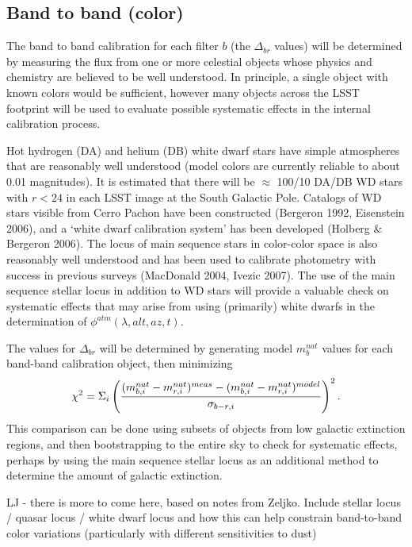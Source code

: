 \documentclass[12pt,preprint]{aastex}
\begin{document}
\subsection{Band to band (color)}

The band to band calibration for each filter $b$ (the $\Delta_{br}$
values) will be determined by measuring the flux from one or more
celestial objects whose physics and chemistry are believed to be well
understood. In principle, a single object with known colors would be
sufficient, however many objects across the LSST footprint
will be used to evaluate possible systematic effects in the internal
calibration process. 

Hot hydrogen (DA) and helium (DB) white dwarf stars have simple
atmospheres that are reasonably well understood (model colors are
currently reliable to about 0.01 magnitudes). It is estimated that
there will be $\approx$ 100/10 DA/DB WD stars with $r<24$ in each LSST
image at the South Galactic Pole. Catalogs of WD stars visible from
Cerro Pachon have been constructed (Bergeron 1992, Eisenstein
2006), and a `white dwarf calibration system' has been developed
(Holberg \& Bergeron 2006). The locus of main sequence stars in
color-color space is also reasonably well understood and has been used
to calibrate photometry with success in previous surveys (MacDonald
2004, Ivezic 2007). The use of the main sequence stellar locus in addition to
WD stars will provide a valuable check on systematic effects that may
arise from using (primarily) white dwarfs in the determination of
$\phi^{atm}(\lambda,alt,az,t)$. 

The values for $\Delta_{br}$ will be determined by generating model
$m_b^{nat}$ values for each band-band calibration object, then
minimizing 
\begin{equation}
\chi^2 = \Sigma_{i} \left( { (m_{b,i}^{nat} - m_{r,i}^{nat})^{meas} - (m_{b,i}^{nat}
    - m_{r,i}^{nat})^{model} \over  \sigma_{b-r,i}}\right) ^2. 
\end{equation}
This comparison can
be done using subsets of objects from low galactic extinction regions,
and then bootstrapping to the entire sky to check for systematic
effects, perhaps by using the main sequence stellar locus as an
additional method to determine the amount of galactic extinction. 

LJ - there is more to come here, based on notes from Zeljko. Include 
stellar locus / quasar locus / white dwarf locus and how this 
can help constrain band-to-band color variations (particularly with
different sensitivities to dust)
\end{document}
